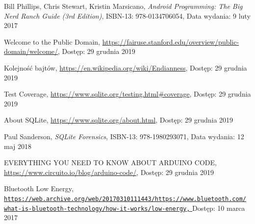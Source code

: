 \documentclass[a4paper,12pt, twoside]{article}
\begin{document}
\begin{thebibliography}{}
    	    Bill Phillips, Chris Stewart, Kristin Marsicano, \textit{Android Programming: The Big Nerd Ranch Guide (3rd Edition)}, ISBN-13: 978-0134706054,
    		\newline Data wydania: 9 luty 2017
    		
    		Welcome to the Public Domain,
    		\newline\url{https://fairuse.stanford.edu/overview/public-domain/welcome/}, 
    		\newline Dostęp: 29 grudnia 2019
    		
    		Kolejność bajtów,
    		\newline\url{https://en.wikipedia.org/wiki/Endianness}, 
    		\newline Dostęp: 29 grudnia 2019
    		
    		Test Coverage,
    		\newline\url{https://www.sqlite.org/testing.html#coverage}, 
    		\newline Dostęp: 29 grudnia 2019
    		
    		About SQLite,
    		\newline\url{https://www.sqlite.org/about.html}, 
    		\newline Dostęp: 29 grudnia 2019
    		
    	    Paul Sanderson, \textit{SQLite Forensics}, ISBN-13: 978-1980293071,
    		\newline Data wydania: 12 maj 2018
    		
    		EVERYTHING YOU NEED TO KNOW ABOUT ARDUINO CODE,
    		\newline\url{https://www.circuito.io/blog/arduino-code/}, 
    		\newline Dostęp: 29 grudnia 2019
    		
    		Bluetooth Low Energy,
    		\newline\href{https://web.archive.org/web/20170310111443/https://www.bluetooth.com/what-is-bluetooth-technology/how-it-works/low-energy}
    		 {\nolinkurl{https://web.archive.org/web/20170310111443/https://www.bluetooth.com/}
                 \\
                  \nolinkurl{what-is-bluetooth-technology/how-it-works/low-energy,}
                 }
    		\newline Dostęp: 10 marca 2017
    		

\end{thebibliography}
\end{document}
